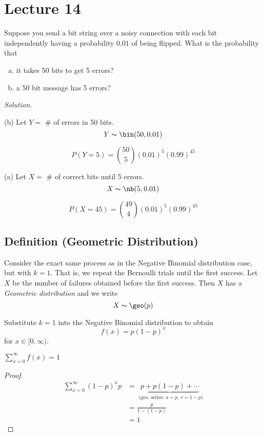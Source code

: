 \section{Lecture 14}

Suppose you send a bit string over a noisy connection with
each bit independently having a probability $ 0.01 $ of being
flipped. What is the probability that
\begin{enumerate}[(a)]
    \item it takes 50 bits to get 5 errors?
    \item a 50 bit message has 5 errors?
\end{enumerate}

\emph{Solution.}

(b) Let $ Y= $ \# of errors in 50 bits. 
\[ Y\thicksim\bin(50,0.01) \]

\[ P(Y=5)=\binom{50}{5}(0.01)^5(0.99)^{45} \]

(a) Let $ X= $ \# of correct bits until 5 errors.
\[ X\thicksim\nb(5,0.01) \]

\[ P(X=45)=\binom{49}{4}(0.01)^5(0.99)^{45} \]


\begin{defbox}
    \subsection{Definition (Geometric Distribution)}
    Consider the exact same process as in the Negative Binomial distribution
    case, but with $ k=1 $. That is, we repeat the Bernoulli trials until
    the first success. Let $ X $ be the number of failures obtained before
    the first success. Then $ X $ has a \emph{Geometric distribution}
    and we write
    \[ X \thicksim \geo(p) \]
\end{defbox}


Substitute $ k=1 $ into the Negative Binomial distribution to obtain
\[ f(x)=p(1-p)^x \]
for $ x\in[0,\infty) $.


$ \sum\limits_{x=0}^{\infty} f(x) = 1$

\begin{proof}
    \begin{align*}
        \sum\limits_{x=0}^{\infty} (1-p)^x p
         & =\underbrace{p+p(1-p)+\cdots}_
        \text{ (geo. series: $a=p$, $r=1-p$)} \\
         & =\frac{p}{1-(1-p)}                 \\
         & =1
    \end{align*}
\end{proof}

